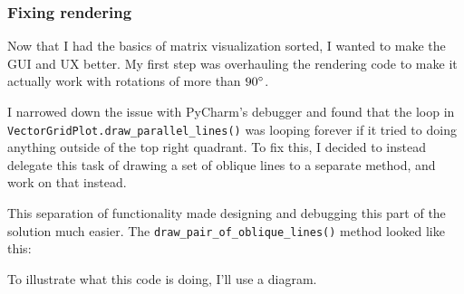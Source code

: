 \documentclass[../development.tex]{subfiles}
\begin{document}
\subsubsection{Fixing rendering\label{development:improving-the-gui:fixing-rendering}}

Now that I had the basics of matrix visualization sorted, I wanted to make the GUI and UX better. My first step was overhauling the rendering code to make it actually work with rotations of more than $90\degree$.

I narrowed down the issue with PyCharm's debugger and found that the loop in \texttt{VectorGridPlot.draw_parallel_lines()} was looping forever if it tried to doing anything outside of the top right quadrant. To fix this, I decided to instead delegate this task of drawing a set of oblique lines to a separate method, and work on that instead.


This separation of functionality made designing and debugging this part of the solution much easier. The \texttt{draw_pair_of_oblique_lines()} method looked like this:


To illustrate what this code is doing, I'll use a diagram.
\end{document}
